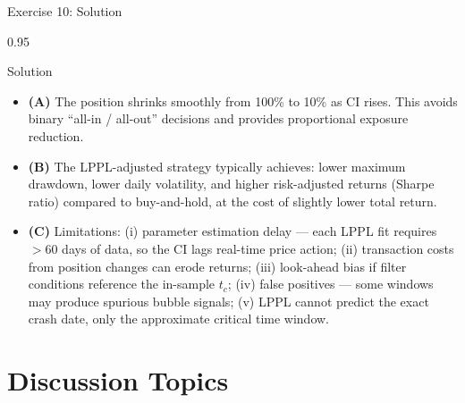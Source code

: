 \documentclass[9pt, aspectratio=169, t]{beamer}
\begin{document}
\begin{frame}{Exercise 10: Solution}
    \begin{cminipage}{0.95\textwidth}
    \begin{exampleblock}{Solution}
        {\small
        \begin{itemize}\setlength{\itemsep}{3pt}
            \item \textcolor{MainBlue}{\textbf{(A)}} The position shrinks smoothly from 100\% to 10\% as CI rises. This avoids binary ``all-in / all-out'' decisions and provides proportional exposure reduction.
            \item \textcolor{MainBlue}{\textbf{(B)}} The LPPL-adjusted strategy typically achieves: lower maximum drawdown, lower daily volatility, and higher risk-adjusted returns (Sharpe ratio) compared to buy-and-hold, at the cost of slightly lower total return.
            \item \textcolor{MainBlue}{\textbf{(C)}} Limitations: (i) parameter estimation delay --- each LPPL fit requires $>60$ days of data, so the CI lags real-time price action; (ii) transaction costs from position changes can erode returns; (iii) look-ahead bias if filter conditions reference the in-sample $t_c$; (iv) false positives --- some windows may produce spurious bubble signals; (v) LPPL cannot predict the exact crash date, only the approximate critical time window.
        \end{itemize}
        }
    \end{exampleblock}
    \end{cminipage}
\end{frame}

\section{Discussion Topics}
\end{document}

